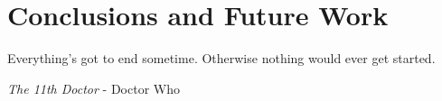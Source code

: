 \chapter{Conclusions and Future Work}\label{chapter:conclusions}

\epigraph{Everything’s got to end sometime. Otherwise nothing would ever get started.}{\textit{The 11th Doctor} - Doctor Who}